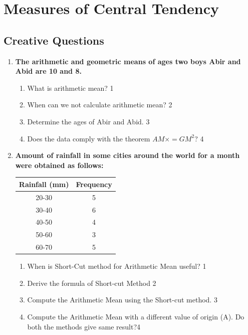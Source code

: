 \documentclass[a4paper,oneside]{book}
\begin{document}
\chapter{Measures of Central Tendency} 
\section{Creative Questions}
\begin{enumerate}

   \item
	  \textbf{The arithmetic and geometric means of ages two boys Abir and Abid are 10 and 8.} 
  
  \begin{enumerate}
    \item
	What is arithmetic mean? \hfill 1
    \item
	When can we not calculate arithmetic mean? \hfill 2
    \item  
	Determine the ages of Abir and Abid. \hfill 3
    \item
	Does the data comply with the theorem $\displaystyle AM \times  = GM^2$? \hfill 4
  \end{enumerate}
  
   \item
	  \textbf{Amount of rainfall in some cities around the world for a month were obtained as follows:} 
	  
	      \begin{table}[h]
    \centering
\begin{tabular}{c|c}
\textbf{Rainfall (mm)} & \textbf{Frequency} \\ \hline
20-30                  & 5                  \\ \hline
30-40                  & 6                  \\ \hline
40-50                  & 4                  \\ \hline
50-60                  & 3                  \\
60-70                  & 5                 
\end{tabular}
\end{table}

    \begin{enumerate}
    \item
	When is Short-Cut method for Arithmetic Mean useful? \hfill 1
    \item
	Derive the formula of Short-cut Method \hfill 2
    \item  
	Compute the Arithmetic Mean using the Short-cut method. \hfill 3
    \item
	Compute the Arithmetic Mean with a different value of origin (A). Do both the methods give same result?\hfill 4
  \end{enumerate}
  

\end{enumerate}
\end{document}
